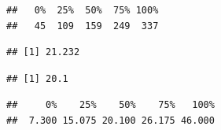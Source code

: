 \documentclass[
]{article}
\newenvironment{Shaded}{\begin{snugshade}}{\end{snugshade}}
\newcommand{\CommentTok}[1]{\textcolor[rgb]{0.56,0.35,0.01}{\textit{#1}}}
\newcommand{\FunctionTok}[1]{\textcolor[rgb]{0.00,0.00,0.00}{#1}}
\newcommand{\NormalTok}[1]{#1}
\newcommand{\SpecialCharTok}[1]{\textcolor[rgb]{0.00,0.00,0.00}{#1}}
\begin{document}
\begin{Shaded}
\end{Shaded}

\begin{verbatim}
##   0%  25%  50%  75% 100% 
##   45  109  159  249  337
\end{verbatim}

\begin{Shaded}
\end{Shaded}

\begin{verbatim}
## [1] 21.232
\end{verbatim}

\begin{Shaded}
\end{Shaded}

\begin{verbatim}
## [1] 20.1
\end{verbatim}

\begin{Shaded}
\end{Shaded}

\begin{verbatim}
##     0%    25%    50%    75%   100% 
##  7.300 15.075 20.100 26.175 46.000
\end{verbatim}
\end{document}
